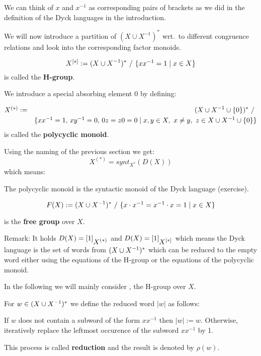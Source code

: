 We can think of $x$ and $x^{-1}$ as corresponding pairs of
brackets as we did in the definition of the Dyck languages in the introduction.

We will now introduce a partition of $(X \cup X^{-1})^*$ wrt.\ to
different congruence relations and look into the corresponding factor monoids.

\begin{definition}
\[ \hgroup{X} := (\unioninv{X})^*\ /\ \setof{x x^{-1} = 1 \mid x \in X} \] is
called the {\bf H-group}.
\end{definition}

We introduce a special absorbing element $0$ by defining:
\begin{definition}
\begin{eqnarray*}
\mbox{${X}^{(*)}$} & := & (X \cup {X}^{-1} \cup \mbox{$\{0\}$})^*\ /\ \\
& & \mbox{$\{x x^{-1} = 1,\,x y^{-1} = 0,\,0 z = z 0 = 0 \mid x,y \in X,\ x\neq
y,\ z \in X \cup {X}^{-1} \cup \mbox{$\{0\}$}\}$}
\end{eqnarray*}
is called the {\bf polycyclic monoid}.
\end{definition}

Using the naming of the previous section we get:
\[ X^{(*)} = synt_{X^*}(D(X)) \]
which means:

The polycyclic monoid is the syntactic monoid of the Dyck language (exercise).

\begin{definition}
\[ F(X) := (X \cup {X}^{-1})^*\ /\ \mbox{$\{x \cdot x^{-1} = x^{-1} \cdot x = 1 \mid
x \in X\}$}
\]
\end{definition}
is the {\bf free group} over $X$.

Remark: It holds $D(X) = [1]_{\mbox{${X}^{(*)}$}}$ and $D(X) = [1]_{\mbox{${X}^{[*]}$}}$ which
means the Dyck language is the set of words from $(X \cup {X}^{-1})^*$ which can be
reduced to the empty word either using the equations of the H-group or the
equations of the polycyclic monoid.

In the following we will mainly consider , the H-group over $X$.

For $w \in (X \cup {X}^{-1})^*$ we define the reduced word $|w|$ as follows: 

If $w$ does not contain a subword of the form $x x^{-1}$ then $|w| := w$.
Otherwise, iteratively replace the leftmost occurence of the subword $x
x^{-1}$ by 1.

This process is called {\bf reduction} and the result is denoted by $\rho(w)$.

